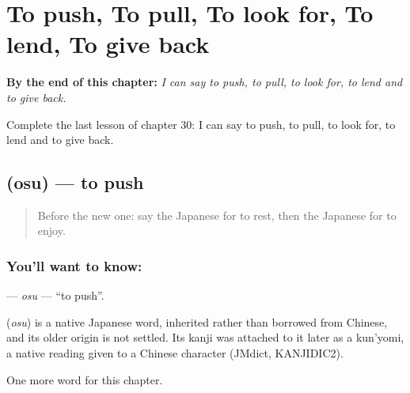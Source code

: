 
\chapter{To push, To pull, To look for, To lend, To give back}
\label{ch:ja-to-push-to-pull-to-look-for-to-lend-to-give-back}

\begin{chapteropening}
\textbf{By the end of this chapter:} \emph{I can say to push, to pull, to look for, to lend and to give back.}

Complete the last lesson of chapter 30: I can say to push, to pull, to look for, to lend and to give back.
\end{chapteropening}

\section[\texorpdfstring{\ja{おす} (osu)}{おす (osu)}]{ (osu) — to push}

\label{lesson:JA-C30-osu}



\begin{quote}
Before the new one: say the Japanese for to rest, then the Japanese for to enjoy.
\end{quote}

\subsection*{You'll want to know: }
\textbf{} — \emph{osu} — \textquotedblleft{}to push\textquotedblright{}.

\begin{cousinweb}
\textbf{} (\emph{osu}) is a native Japanese word, inherited rather than borrowed from Chinese, and its older origin is not settled. Its kanji was attached to it later as a kun'yomi, a native reading given to a Chinese character (JMdict, KANJIDIC2).
\end{cousinweb}

\begin{grammarlens}[title={What you've built}]
One more word for this chapter.
\end{grammarlens}

